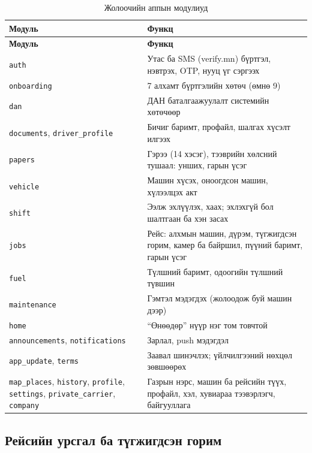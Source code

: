 \documentclass[
12pt,
oneside,
english,
onehalfspacing,
nolistspacing,
headsepline,
]{MUST-Thesis}
\begin{document}
{\small
\renewcommand{\arraystretch}{1.2}
\begin{longtable}{|L{3.2cm}|L{10.6cm}|}
\caption{Жолоочийн аппын модулиуд}\label{tab:ch4-app}\\
\hline
{}\textbf{Модуль} & \textbf{Функц} \\ \hline
\endfirsthead
\hline
{}\textbf{Модуль} & \textbf{Функц} \\ \hline
\endhead
\texttt{auth} & Утас ба SMS (verify.mn) бүртгэл, нэвтрэх, OTP, нууц үг сэргээх \\ \hline
\texttt{onboarding} & 7 алхамт бүртгэлийн хөтөч (өмнө 9) \\ \hline
\texttt{dan} & ДАН баталгаажуулалт системийн хөтөчөөр \\ \hline
\texttt{documents}, \texttt{driver\_profile} & Бичиг баримт, профайл, шалгах хүсэлт илгээх \\ \hline
\texttt{papers} & Гэрээ (14 хэсэг), тээврийн хөлсний тушаал: унших, гарын үсэг \\ \hline
\texttt{vehicle} & Машин хүсэх, оноогдсон машин, хүлээлцэх акт \\ \hline
\texttt{shift} & Ээлж эхлүүлэх, хаах; эхлэхгүй бол шалтгаан ба хэн засах \\ \hline
\texttt{jobs} & Рейс: алхмын машин, дүрэм, түгжигдсэн горим, камер ба байршил, пүүний баримт, гарын үсэг \\ \hline
\texttt{fuel} & Түлшний баримт, одоогийн түлшний түвшин \\ \hline
\texttt{maintenance} & Гэмтэл мэдэгдэх (жолоодож буй машин дээр) \\ \hline
\texttt{home} & ``Өнөөдөр'' нүүр нэг том товчтой \\ \hline
\texttt{announcements}, \texttt{notifications} & Зарлал, push мэдэгдэл \\ \hline
\texttt{app\_update}, \texttt{terms} & Заавал шинэчлэх; үйлчилгээний нөхцөл зөвшөөрөх \\ \hline
\texttt{map\_places}, \texttt{history}, \texttt{profile}, \texttt{settings}, \texttt{private\_carrier}, \texttt{company} & Газрын нэрс, машин ба рейсийн түүх, профайл, хэл, хувиараа тээвэрлэгч, байгууллага \\ \hline
\end{longtable}
}

\subsection{Рейсийн урсгал ба түгжигдсэн горим}
\end{document}
